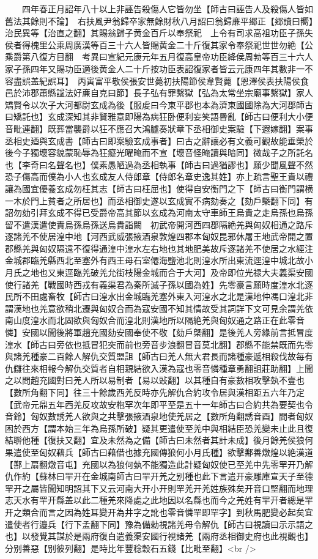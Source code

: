 　　四年春正月詔年八十以上非誣告殺傷人它皆勿坐【師古曰誣告人及殺傷人皆如舊法其餘則不論】　右扶風尹翁歸卒家無餘財秋八月詔曰翁歸亷平郷正【郷讀曰嚮】治民異等【治直之翻】其賜翁歸子黄金百斤以奉祭祀　上令有司求高祖功臣子孫失侯者得槐里公乘周廣漢等百三十六人皆賜黄金二十斤復其家令奉祭祀世世勿絶【公乘爵第八復方目翻　考異曰宣紀元康元年五月復高皇帝功臣絳侯周勃等百三十六人家子孫四年又賜功臣適後黄金人二十斤按功臣表詔復家者皆云元康四年其數非一不容盡誤盖紀誤耳】　丙寅富平敬侯張安世薨初扶陽節侯韋賢薨【恩澤侯表扶陽侯食邑於沛郡蕭縣諡法好亷自克曰節】長子弘有罪繫獄【弘為太常坐宗廟事繫獄】家人矯賢令以次子大河都尉玄成為後【服䖍曰今東平郡也本為濟東國國除為大河郡師古曰矯託也】玄成深知其非賢雅意即陽為病狂卧便利妄笑語昬亂【師古曰便利大小便音毗連翻】既葬當襲爵以狂不應召大鴻臚奏狀章下丞相御史案驗【下遐嫁翻】案事丞相史廼與玄成書【師古曰即案驗玄成事者】曰古之辭讓必有文義可觀故能垂榮於後今子獨壞容貌蒙恥辱為狂癡光曜晻而不宣【壞音怪晻讀與暗同】微哉子之所託名也【李奇曰名聲名也】僕素愚陋過為丞相執事【師古曰過猶謬也】願少聞風聲不然恐子傷高而僕為小人也玄成友人侍郎章【侍郎名章史逸其姓】亦上疏言聖王貴以禮讓為國宜優養玄成勿枉其志【師古曰枉屈也】使得自安衡門之下【師古曰衡門謂横一木於門上貧者之所居也】而丞相御史遂以玄成實不病劾奏之【劾戶槩翻下同】有詔勿劾引拜玄成不得已受爵帝高其節以玄成為河南太守車師王烏貴之走烏孫也烏孫留不遣漢遣使責烏孫烏孫送烏貴詣闕　初武帝開河西四郡隔絶羌與匈奴相通之路斥逐諸羌不使居湟中地【河西武威張掖酒泉敦煌四郡本匈奴昆邪休屠王地武帝開之置郡縣羌與匈奴隔遠不復得通湟中湟水左右地也其地肥美故斥逐諸羌不使居之水經注金城郡臨羌縣西北至塞外有西王母石室僊海鹽池北則湟水所出東流逕湟中城北故小月氏之地也又東逕臨羌破羌允街枝陽金城而合于大河】及帝即位光禄大夫義渠安國使行諸羌【戰國時西戎有義渠君為秦所滅子孫以國為姓】先零豪言願時度湟水北逐民所不田處畜牧【師古曰湟水出金城臨羌塞外東入河湟水之北是漢地仲馮口湟北非謂漢地也羌意欲稍北遷與匈奴合而為寇安國不知其情故受其詞詳下文可見余謂羌依南山度湟水而北固欲與匈奴合而湟北則漢地所以隔絶羌與匈奴通之路正在此零音憐】安國以聞後將軍趙充國劾安國奉使不敬【劾戶槩翻】是後羌人旁緣前言抵冒度湟水【師古曰旁依也抵冒犯突而前也旁音步浪翻冒音莫北翻】郡縣不能禁既而先零與諸羌種豪二百餘人解仇交質盟詛【師古曰羌人無大君長而諸種豪遞相殺伐故每有仇讎往來相報今解仇交質者自相親結欲入漢為寇也零音憐種章勇翻詛莊助翻】上聞之以問趙充國對曰羌人所以易制者【易以䜴翻】以其種自有豪數相攻擊埶不壹也【數所角翻下同】往三十餘歲西羌反時亦先解仇合約攻令居與漢相距五六年乃定【武帝元鼎五年西羌反攻故安枹罕次年即平至是五十一年師古曰合約共為要契也令音鈴】匈奴數誘羌人欲與之共擊張掖酒泉地使羌居之【數所角翻誘音酉】間者匈奴困於西方【謂本始三年為烏孫所破】疑其更遣使至羌中與相結臣恐羌變未止此且復結聨他種【復扶又翻】宜及未然為之備【師古曰未然者其計未成】後月餘羌侯狼何果遣使至匈奴藉兵【師古曰藉借也據充國傳狼何小月氏種】欲擊鄯善燉煌以絶漢道【鄯上扇翻燉音屯】充國以為狼何埶不能獨造此計疑匈奴使已至羌中先零䍐开乃解仇作約【蘇林曰䍐开在金城南師古曰䍐开羌之别種也此下言遣开豪雕庫宣天子至德䍐开之屬皆聞知明詔其下又云河南大开小开則䍐羌开羌姓族殊矣开音口堅翻而地理志天水有䍐开縣盖以此二種羌來降處之此地因以名縣也而今之羌姓有䍐开者總是䍐开之類合而言之因為姓耳變开為井字之訛也零音憐䍐即罕字】到秋馬肥變必起矣宜遣使者行邉兵【行下孟翻下同】豫為備勑視諸羌母令解仇【師古曰視讀曰示示語之也】以發覺其謀於是兩府復白遣義渠安國行視諸羌【兩府丞相御史府也此視觀也】分别善惡【别彼列翻】是時比年豐稔穀石五錢【比毗至翻】<br />

